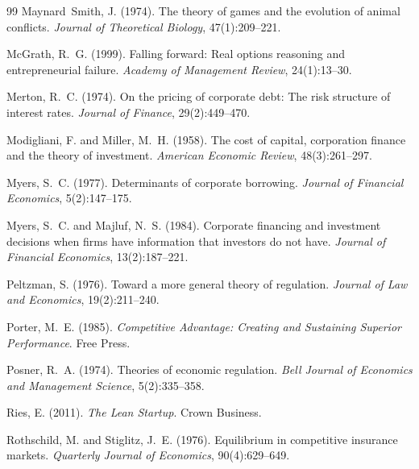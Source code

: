 \documentclass[12pt,a4paper,oneside]{book}
\theoremstyle{definition}
\theoremstyle{remark}
\begin{document}
\begin{thebibliography}{99}
Maynard~Smith, J. (1974).
\newblock The theory of games and the evolution of animal conflicts.
\newblock \textit{Journal of Theoretical Biology}, 47(1):209--221.

McGrath, R.~G. (1999).
\newblock Falling forward: Real options reasoning and entrepreneurial failure.
\newblock \textit{Academy of Management Review}, 24(1):13--30.

Merton, R.~C. (1974).
\newblock On the pricing of corporate debt: The risk structure of interest rates.
\newblock \textit{Journal of Finance}, 29(2):449--470.

Modigliani, F. and Miller, M.~H. (1958).
\newblock The cost of capital, corporation finance and the theory of investment.
\newblock \textit{American Economic Review}, 48(3):261--297.

Myers, S.~C. (1977).
\newblock Determinants of corporate borrowing.
\newblock \textit{Journal of Financial Economics}, 5(2):147--175.

Myers, S.~C. and Majluf, N.~S. (1984).
\newblock Corporate financing and investment decisions when firms have
  information that investors do not have.
\newblock \textit{Journal of Financial Economics}, 13(2):187--221.

Peltzman, S. (1976).
\newblock Toward a more general theory of regulation.
\newblock \textit{Journal of Law and Economics}, 19(2):211--240.

Porter, M.~E. (1985).
\newblock \textit{Competitive Advantage: Creating and Sustaining Superior Performance}.
\newblock Free Press.

Posner, R.~A. (1974).
\newblock Theories of economic regulation.
\newblock \textit{Bell Journal of Economics and Management Science}, 5(2):335--358.

Ries, E. (2011).
\newblock \textit{The Lean Startup}.
\newblock Crown Business.

Rothschild, M. and Stiglitz, J.~E. (1976).
\newblock Equilibrium in competitive insurance markets.
\newblock \textit{Quarterly Journal of Economics}, 90(4):629--649.


\end{thebibliography}
\end{document}
